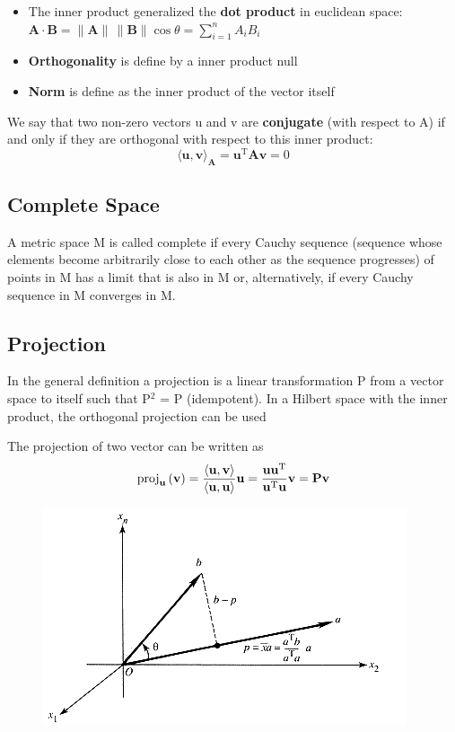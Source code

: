 \documentclass[twocolumn]{article}
\numberwithin{equation}{section}
\begin{document}
\begin{itemize}
	\item The inner product generalized the \textbf{dot product} in euclidean space:
	$\mathbf{A}\cdot \mathbf{B} = \|\mathbf A\|\,\|\mathbf B\|\cos\theta = \sum_{i=1}^n A_iB_i $ 
	\item \textbf{Orthogonality} is define by a inner product null
	\item \textbf{Norm} is define as the inner product of the vector itself
\end{itemize}

We say that two non-zero vectors u and v are \textbf{conjugate} (with respect to A) if and only if they are orthogonal with respect to this inner product:
$$  \langle \mathbf{u},\mathbf{v} \rangle_\mathbf{A}=\mathbf{u}^\mathrm{T} \mathbf{A} \mathbf{v} = 0 $$

	\subsection{Complete Space}
A metric space M is called complete if every Cauchy sequence (sequence whose elements become arbitrarily close to each other as the sequence progresses) of points in M has a limit that is also in M or, alternatively, if every Cauchy sequence in M converges in M.

	\subsection{Projection}
In the general definition a projection is a linear transformation P from a vector space to itself such that P$^2$ = P (idempotent). In a Hilbert space with the inner product, the orthogonal projection can be used

The projection of two vector can be written as
	$$\mathrm{proj}_{\mathbf{u}}\,(\mathbf{v}) = {\langle \mathbf{u}, \mathbf{v}\rangle\over\langle \mathbf{u}, \mathbf{u}\rangle}\mathbf{u} =\frac{\mathbf{u} \mathbf{u}^\mathrm{T} }{\mathbf{u}^\mathrm{T} \mathbf{u}} \mathbf{v} = \mathbf{P} \mathbf{v} $$
\begin{figure}[H]
\centering
    \includegraphics[width=.30\textwidth]{projection1.png}
\end{figure}
\end{document}
